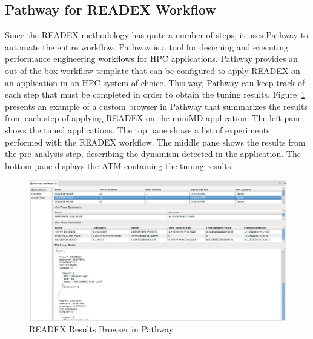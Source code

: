 \subsection{Pathway for READEX Workflow}
\label{sec:pathway_for_readex_workflow}

Since the READEX methodology has quite a number of steps, it uses Pathway to automate the entire workflow. Pathway \cite{Pathway:Petkov13} is a tool for designing and executing performance engineering workflows for HPC applications. Pathway provides an out-of-the box workflow template that can be configured to apply READEX on an application in an HPC system of choice. This way, Pathway can keep track of each step that must be completed in order to obtain the tuning results. Figure~\ref{fig:pathway_browser} presents an example of a custom browser in Pathway that summarizes the results from each step of applying READEX on the miniMD application. The left pane shows the tuned applications. The top pane shows a list of experiments performed with the READEX workflow. The middle pane shows the results from the pre-analysis step, describing the dynamism detected in the application. The bottom pane displays the ATM containing the tuning results.


\begin{figure}[!t]
\centering
\includegraphics[width=.95\columnwidth]{figures/PathwayBrowser.jpeg}
\caption{READEX Results Browser in Pathway}
\label{fig:pathway_browser}
\end{figure}
